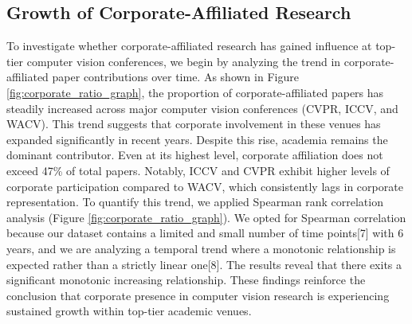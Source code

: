 \documentclass{article}
\begin{document}
\subsection{Growth of Corporate-Affiliated Research}
\vspace{-7pt}
To investigate whether corporate-affiliated research has gained influence at top-tier computer vision conferences, we begin by analyzing the trend in corporate-affiliated paper contributions over time. As shown in Figure \ref{fig:corporate_ratio_graph}, the proportion of corporate-affiliated papers has steadily increased across major computer vision conferences (CVPR, ICCV, and WACV). This trend suggests that corporate involvement in these venues has expanded significantly in recent years. Despite this rise, academia remains the dominant contributor. Even at its highest level, corporate affiliation does not exceed 47\% of total papers. Notably, ICCV and CVPR exhibit higher levels of corporate participation compared to WACV, which consistently lags in corporate representation. To quantify this trend, we applied Spearman rank correlation analysis (Figure  \ref{fig:corporate_ratio_graph}). We opted for Spearman correlation because our dataset contains a limited and small number of time points[7] with 6 years, and we are analyzing a temporal trend where a monotonic relationship is expected rather than a strictly linear one[8]. The results reveal that there exits a significant monotonic increasing relationship. These findings reinforce the conclusion that corporate presence in computer vision research is experiencing sustained growth within top-tier academic venues.
\vspace{-2pt}

\end{document}
